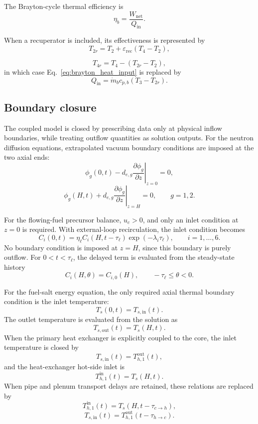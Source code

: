 \documentclass[a4paper,12pt]{article}
\begin{document}
The Brayton-cycle thermal efficiency is
\begin{equation}
\eta_b
=
\frac{W_{\mathrm{net}}}{Q_{\mathrm{in}}}.
\label{eq:brayton_efficiency}
\end{equation}

When a recuperator is included, its effectiveness is represented by
\begin{equation}
T_{2r}
=
T_2
+
\varepsilon_{\mathrm{rec}}
\left(
T_4-T_2
\right),
\label{eq:recuperator_cold_out}
\end{equation}

\begin{equation}
T_{4r}
=
T_4
-
\left(
T_{2r}-T_2
\right),
\label{eq:recuperator_hot_out}
\end{equation}
in which case Eq.~\eqref{eq:brayton_heat_input} is replaced by
\begin{equation}
Q_{\mathrm{in}}
=
\dot{m}_b c_{p,b}
\left(
T_3-T_{2r}
\right).
\label{eq:brayton_heat_input_recuperated}
\end{equation}

\subsection{Boundary closure}

The coupled model is closed by prescribing data only at physical inflow
boundaries, while treating outflow quantities as solution outputs.
For the neutron diffusion equations, extrapolated vacuum boundary
conditions are imposed at the two axial ends:
\[
\phi_g(0,t)-d_{e,g}\left.\frac{\partial \phi_g}{\partial z}\right|_{z=0}=0,
\]
\[
\phi_g(H,t)+d_{e,g}\left.\frac{\partial \phi_g}{\partial z}\right|_{z=H}=0,
\qquad g=1,2.
\]

For the flowing-fuel precursor balance, $u_c>0$, and only an inlet
condition at $z=0$ is required. With external-loop recirculation, the
inlet condition becomes
\[
C_i(0,t)
=
\eta_\ell C_i(H,t-\tau_\ell)
\exp(-\lambda_i\tau_\ell),
\qquad i=1,\ldots,6.
\]
No boundary condition is imposed at $z=H$, since this boundary is purely
outflow. For $0<t<\tau_\ell$, the delayed term is evaluated from the
steady-state history
\[
C_i(H,\theta)=C_{i,0}(H),
\qquad -\tau_\ell\leq \theta<0.
\]

For the fuel-salt energy equation, the only required axial thermal
boundary condition is the inlet temperature:
\[
T_s(0,t)=T_{s,\mathrm{in}}(t).
\]
The outlet temperature is evaluated from the solution as
\[
T_{s,\mathrm{out}}(t)=T_s(H,t).
\]
When the primary heat exchanger is explicitly coupled to the core, the
inlet temperature is closed by
\[
T_{s,\mathrm{in}}(t)=T_{h,1}^{\mathrm{out}}(t),
\]
and the heat-exchanger hot-side inlet is
\[
T_{h,1}^{\mathrm{in}}(t)=T_s(H,t).
\]
When pipe and plenum transport delays are retained, these relations are
replaced by
\[
T_{h,1}^{\mathrm{in}}(t)=T_s(H,t-\tau_{c\rightarrow h}),
\]
\[
T_{s,\mathrm{in}}(t)=T_{h,1}^{\mathrm{out}}(t-\tau_{h\rightarrow c}).
\]
\end{document}
